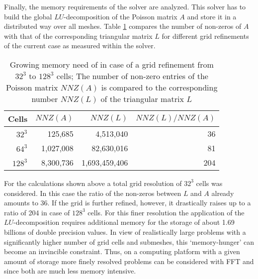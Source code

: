 Finally, the memory requirements of the \uglmat{} solver are analyzed.
This solver has to build the global $LU$-decomposition of the Poisson matrix $A$ and store it in a distributed way over all meshes.
Table \ref{TAB_scarc_duct_flow_memory_needs} compares the number of non-zeros of $A$ with that of the corresponding triangular matrix $L$ for different grid refinements of the current case as measured within the solver.

\begin{table}[h]
\begin{center}
{
\begin{tabular}{|r|r|r|r|}
\hline
Cells         &   $NNZ(A)$     &        $NNZ(L)$ &  $NNZ(L)/NNZ(A)$   \\  \hline
  $32^3$   &      125,685      &        4,513,040 &  36    \hspace{0.4in}                       \\
  $64^3$   &   1,027,008      &      82,630,016 &  81    \hspace{0.4in}                        \\
  $128^3$ &   8,300,736      & 1,693,459,406 &  204   \hspace{0.4in}                        \\  \hline
\end{tabular}
}
\caption[Growing memory need of \uglmat{} in case of a grid refinement]{Growing memory need of \uglmat{} in case of a grid refinement from $32^3$ to $128^3$ cells; The number of non-zero entries of the Poisson matrix $NNZ(A)$ is compared to the corresponding number $NNZ(L)$ of the triangular matrix $L$}
\label{TAB_scarc_duct_flow_memory_needs}
\end{center}
\end{table}

For the calculations shown above a total grid resolution of $32^3$ cells was considered. In this case
the ratio of the non-zeros between $L$ and $A$ already amounts to 36. 
If the grid is further refined, however, it drastically raises up to a ratio of 204 in case of $128^3$ cells. For this finer resolution
the application of the $LU$-decomposition requires additional memory for the storage of
about 1.69 billions of double precision values. 
In view of realistically large problems with a significantly higher number of grid cells and submeshes, this `memory-hunger' can become an invincible constraint. Thus, on a computing platform with a given amount of storage more finely resolved problems can be considered with FFT and \scarc{} since both are much less memory intensive.

